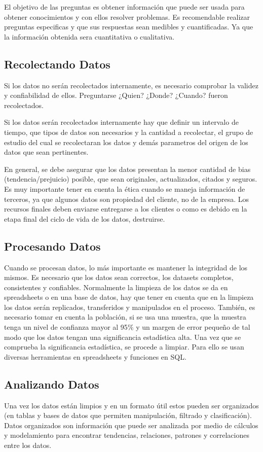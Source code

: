 \documentclass[12pt,a4paper,openright]{article}
\begin{document}
El objetivo de las preguntas es obtener informaci\'on que puede ser usada para obtener conocimientos y con ellos resolver problemas. Es recomendable realizar preguntas especificas y que sus respuestas sean medibles y cuantificadas. Ya que la información obtenida sera cuantitativa o cualitativa.

\subsection{Recolectando Datos}
Si los datos no serán recolectados internamente, es necesario comprobar la validez y confiabilidad de ellos. Preguntarse ¿Quien? ¿Donde? ¿Cuando? fueron recolectados.

Si los datos serán recolectados internamente hay que definir un intervalo de tiempo, que tipos de datos son necesarios y la cantidad a recolectar, el grupo de estudio del cual se recolectaran los datos y dem\'as parametros del origen de los datos que sean pertinentes.

En general, se debe asegurar que los datos presentan la menor cantidad de bias (tendencia/prejuicio) posible, que sean originales, actualizados, citados y seguros. Es muy importante tener en cuenta la \'etica cuando se maneja informaci\'on de terceros, ya que algunos datos son propiedad del cliente, no de la empresa. Los recursos finales deben enviarse entregarse a los clientes o como es debido en la etapa final del ciclo de vida de los datos, destruirse.

\subsection{Procesando Datos}

Cuando se procesan datos, lo m\'as importante es mantener la integridad de los mismos. Es necesario que los datos sean correctos, los datasets completos, consistentes y confiables. Normalmente la limpieza de los datos se da en spreadsheets o en una base de datos, hay que tener en cuenta que en la limpieza los datos serán replicados, transferidos y manipulados en el proceso. También, es necesario tomar en cuenta la población, si se usa una muestra, que la muestra tenga un nivel de confianza mayor al 95$\%$ y un margen de error pequeño de tal modo que los datos tengan una significancia estadística alta. Una vez que se comprueba la significancia estadística, se procede a limpiar. Para ello se usan diversas herramientas en spreadsheets y funciones en SQL.

\subsection{Analizando Datos}
Una vez los datos están limpios y en un formato útil estos pueden ser organizados (en tablas y bases de datos que permiten manipulación, filtrado y clasificación). Datos organizados son información que puede ser analizada por medio de cálculos y modelamiento para encontrar tendencias, relaciones, patrones y correlaciones entre los datos.
\end{document}
